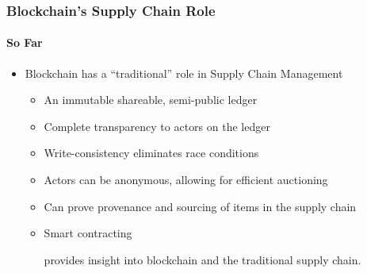 \begin{frame}
  \frametitle{Blockchain's Supply Chain Role}
  \framesubtitle{So Far}
  \begin{itemize}
    \item<1-> Blockchain has a ``traditional'' role in Supply Chain Management

          \begin{itemize}

            \item <2-> An immutable shareable, semi-public ledger
            \item <2-> Complete transparency to actors on the ledger
            \item <2-> Write-consistency eliminates race conditions
            \item <2-> Actors can be anonymous, allowing for efficient auctioning
            \item <2-> Can prove provenance and sourcing of items in the supply chain
            \item <2-> Smart contracting

           {\scriptsize{\textcite{hughesBitcoinWhatBlockchain2019} provides insight into blockchain and the traditional supply chain.}}

  \end{itemize}
          \end{itemize}
\end{frame}

